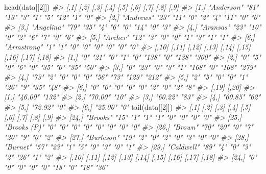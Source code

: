 \documentclass[
]{krantz}
\makeatletter
\newenvironment{Shaded}{\begin{snugshade}}{\end{snugshade}}
\newcommand{\CommentTok}[1]{\textcolor[rgb]{0.37,0.37,0.37}{\textit{#1}}}
\newcommand{\DecValTok}[1]{\textcolor[rgb]{0.06,0.06,0.06}{#1}}
\newcommand{\FunctionTok}[1]{\textcolor[rgb]{0,0,0}{#1}}
\newcommand{\NormalTok}[1]{#1}
\newenvironment{kframe}{%
\medskip{}
\setlength{\fboxsep}{.8em}
 \def\at@end@of@kframe{}%
 \ifinner\ifhmode%
  \def\at@end@of@kframe{\end{minipage}}%
  \begin{minipage}{\columnwidth}%
 \fi\fi%
 \def\FrameCommand##1{\hskip\@totalleftmargin \hskip-\fboxsep
 \colorbox{shadecolor}{##1}\hskip-\fboxsep
     \hskip-\linewidth \hskip-\@totalleftmargin \hskip\columnwidth}%
 \MakeFramed {\advance\hsize-\width
   \@totalleftmargin\z@ \linewidth\hsize
   \@setminipage}}%
 {\par\unskip\endMakeFramed%
 \at@end@of@kframe}
\renewenvironment{Shaded}{\begin{kframe}}{\end{kframe}}
\makeatother
\begin{document}
\begin{Shaded}
\begin{Highlighting}[]
\FunctionTok{head}\NormalTok{(data[[}\DecValTok{2}\NormalTok{]])}
\CommentTok{\#\textgreater{}      [,1]        [,2] [,3] [,4] [,5] [,6] [,7] [,8] [,9]}
\CommentTok{\#\textgreater{} [1,] "Anderson"  "81" "13" "3"  "1"  "5"  "12" "1"  "0" }
\CommentTok{\#\textgreater{} [2,] "Andrews"   "23" "11" "0"  "2"  "4"  "11" "0"  "0" }
\CommentTok{\#\textgreater{} [3,] "Angelina"  "79" "35" "4"  "6"  "0"  "14" "0"  "3" }
\CommentTok{\#\textgreater{} [4,] "Aransas"   "23" "10" "0"  "2"  "6"  "7"  "0"  "6" }
\CommentTok{\#\textgreater{} [5,] "Archer"    "12" "3"  "0"  "0"  "1"  "3"  "1"  "1" }
\CommentTok{\#\textgreater{} [6,] "Armstrong" "1"  "1"  "0"  "0"  "0"  "0"  "0"  "0" }
\CommentTok{\#\textgreater{}      [,10] [,11] [,12] [,13] [,14] [,15] [,16] [,17] [,18]}
\CommentTok{\#\textgreater{} [1,] "0"   "21"  "0"   "1"   "0"   "138" "0"   "138" "300"}
\CommentTok{\#\textgreater{} [2,] "0"   "5"   "0"   "6"   "0"   "35"  "0"   "35"  "50" }
\CommentTok{\#\textgreater{} [3,] "0"   "23"  "0"   "3"   "1"   "168" "0"   "168" "279"}
\CommentTok{\#\textgreater{} [4,] "73"  "2"   "0"   "0"   "0"   "56"  "73"  "129" "212"}
\CommentTok{\#\textgreater{} [5,] "2"   "5"   "0"   "0"   "1"   "26"  "9"   "35"  "48" }
\CommentTok{\#\textgreater{} [6,] "0"   "0"   "0"   "0"   "0"   "2"   "0"   "2"   "8"  }
\CommentTok{\#\textgreater{}      [,19]   [,20]}
\CommentTok{\#\textgreater{} [1,] "46.00" "132"}
\CommentTok{\#\textgreater{} [2,] "70.00" "10" }
\CommentTok{\#\textgreater{} [3,] "60.22" "83" }
\CommentTok{\#\textgreater{} [4,] "60.85" "62" }
\CommentTok{\#\textgreater{} [5,] "72.92" "0"  }
\CommentTok{\#\textgreater{} [6,] "25.00" "0"}
\FunctionTok{tail}\NormalTok{(data[[}\DecValTok{2}\NormalTok{]])}
\CommentTok{\#\textgreater{}       [,1]         [,2] [,3] [,4] [,5] [,6] [,7] [,8] [,9]}
\CommentTok{\#\textgreater{} [24,] "Brooks"     "15" "1"  "1"  "1"  "0"  "0"  "0"  "0" }
\CommentTok{\#\textgreater{} [25,] "Brooks (P)" "0"  "0"  "0"  "0"  "0"  "0"  "0"  "0" }
\CommentTok{\#\textgreater{} [26,] "Brown"      "70" "20" "0"  "7"  "20" "9"  "0"  "2" }
\CommentTok{\#\textgreater{} [27,] "Burleson"   "19" "2"  "0"  "2"  "0"  "3"  "0"  "0" }
\CommentTok{\#\textgreater{} [28,] "Burnet"     "57" "23" "1"  "5"  "9"  "3"  "0"  "1" }
\CommentTok{\#\textgreater{} [29,] "Caldwell"   "89" "4"  "0"  "3"  "2"  "26" "1"  "2" }
\CommentTok{\#\textgreater{}       [,10] [,11] [,12] [,13] [,14] [,15] [,16] [,17] [,18]}
\CommentTok{\#\textgreater{} [24,] "0"   "0"   "0"   "0"   "0"   "18"  "0"   "18"  "36" }

\end{Highlighting}
\end{Shaded}
\end{document}
